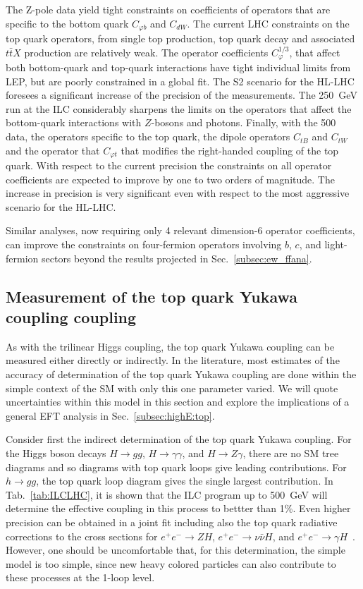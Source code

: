 The Z-pole data yield tight constraints on coefficients of operators that are specific 
to the bottom quark $C_{\varphi b}$ and $C_{dW}$. The current LHC constraints on the
top quark operators, from single top production, top quark decay and associated
$t\bar{t}X$ production are relatively weak. The operator coefficients
$C^{1/3}_{\varphi}$, that affect both bottom-quark and top-quark interactions 
have tight individual limits from LEP, but are poorly constrained in a global fit. 
The S2 scenario for the HL-LHC foresees a significant
increase of the precision of the measurements. The 250~GeV run at the ILC considerably
sharpens the limits on the operators that affect the bottom-quark interactions with 
$Z$-bosons and photons. Finally, with the 500~\GeV{} data, the operators specific to 
the top quark, the dipole operators $C_{tB}$ and $C_{tW}$ and the operator that
$C_{\varphi t}$ that modifies the right-handed coupling of the top quark. 
With respect to the current precision the constraints on all operator coefficients 
are expected to improve by one to two orders of magnitude. The increase in precision 
is very significant even with respect to the most aggressive scenario for the HL-LHC.

Similar analyses, now requiring  only 4 relevant dimension-6 operator coefficients, can
improve the constraints on four-fermion operators involving $b$, $c$,
and light-fermion sectors beyond the results projected in
Sec.~\ref{subsec:ew_ffana}.


\subsection{Measurement of the top quark Yukawa coupling coupling}
\label{subsec:top:topYukawa}


As with the trilinear Higgs coupling, the top quark Yukawa coupling can be
measured either directly or indirectly.  In the literature, most
estimates of the accuracy of determination of the top quark Yukawa
coupling are done within the simple context of the SM with only this
one parameter varied. We will quote uncertainties
within this model in this section and explore the implications of a general 
EFT analysis in Sec.~\ref{subsec:highE:top}.

Consider first the indirect determination of the top quark Yukawa coupling.
For the Higgs boson decays $H\to gg$, $H\to \gamma\gamma$, and $H\to Z \gamma$, 
there are no SM tree diagrams and so diagrams with top quark loops give leading contributions.  
For $h\to gg$, the top quark loop diagram gives the single largest
contribution. In Tab.~\ref{tab:ILCLHC}, it is shown that the ILC
program up to 500~GeV will determine the effective coupling in this process to bettter
than 1\%. Even higher precision can be obtained in a joint fit
including also the top quark radiative corrections to the cross
sections for $e^+e^- \rightarrow ZH$, $e^+e^- \rightarrow \nu\bar\nu
H$, and $e^+e^- \to  \gamma H$~\cite{Boselli:2018zxr}. However, one
should be uncomfortable that, for this determination, the simple model is
too simple, since new heavy colored particles can also contribute to
these processes at the 1-loop level. 


